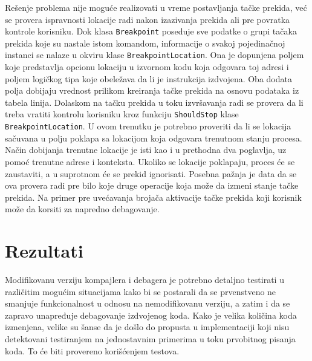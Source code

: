 \documentclass[12pt,oneside]{memoir}
\begin{document}
Rešenje problema nije moguće realizovati u vreme postavljanja tačke prekida, već se provera ispravnosti lokacije radi nakon izazivanja prekida ali pre povratka kontrole korisniku.
Dok klasa \verb|Breakpoint| poseduje sve podatke o grupi tačaka prekida koje su nastale istom komandom, informacije o svakoj pojedinačnoj instanci se nalaze u okviru klase \verb|BreakpointLocation|.
Ona je dopunjena poljem koje predstavlja opcionu lokaciju u izvornom kodu koja odgovara toj adresi i poljem logičkog tipa koje obeležava da li je instrukcija izdvojena.
Oba dodata polja dobijaju vrednost prilikom kreiranja tačke prekida na osnovu podataka iz tabela linija.
Dolaskom na tačku prekida u toku izvršavanja radi se provera da li treba vratiti kontrolu korisniku kroz funkciju \verb|ShouldStop| klase \verb|BreakpointLocation|.
U ovom trenutku je potrebno proveriti da li se lokacija sačuvana u polju poklapa sa lokacijom koja odgovara trenutnom stanju procesa.
Način dobijanja trenutne lokacije je isti kao i u prethodna dva poglavlja, uz pomoć trenutne adrese i konteksta.
Ukoliko se lokacije poklapaju, proces će se zaustaviti, a u suprotnom će se prekid ignorisati.
Posebna pažnja je data da se ova provera radi pre bilo koje druge operacije koja može da izmeni stanje tačke prekida.
Na primer pre uvećavanja brojača aktivacije tačke prekida koji korisnik može da korsiti za napredno debagovanje.

\chapter{Rezultati}
\label{sec:results}

Modifikovanu verziju kompajlera i debagera je potrebno detaljno testirati u različitim mogućim situacijama kako bi se postarali da se prvenstveno ne smanjuje funkcionalnost u odnosu na nemodifikovanu verziju, a zatim i da se zapravo unapređuje debagovanje izdvojenog koda.
Kako je velika količina koda izmenjena, velike su šanse da je došlo do propusta u implementaciji koji nisu detektovani testiranjem na jednostavnim primerima u toku prvobitnog pisanja koda.
To će biti provereno korišćenjem testova.
\end{document}
